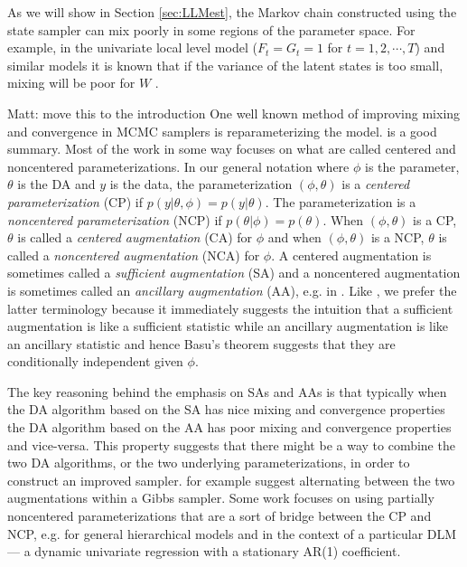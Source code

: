 \documentclass{article}
\newcommand{\matt}[1]{{\color{red} Matt: #1}}
\begin{document}
As we will show in Section \ref{sec:LLMest}, the Markov chain constructed using the state sampler can mix poorly in some regions of the parameter space. For example, in the univariate local level model ($F_t=G_t=1$ for $t=1,2,\cdots,T$) and similar models it is known that if the variance of the latent states is too small, mixing will be poor for $W$ \citep{fruhwirth2004efficient}.

\matt{move this to the introduction}
One well known method of improving mixing and convergence in MCMC samplers is reparameterizing the model. \citet{papaspiliopoulos2007general} is a good summary. Most of the work in some way focuses on what are called centered and noncentered parameterizations. In our general notation where $\phi$ is the parameter, $\theta$ is the DA and $y$ is the data, the parameterization $(\phi,\theta)$ is a {\it centered parameterization} (CP) if $p(y|\theta,\phi)=p(y|\theta)$. The parameterization is a {\it noncentered parameterization} (NCP) if $p(\theta|\phi)=p(\theta)$. When $(\phi,\theta)$ is a CP, $\theta$ is called a {\it centered augmentation} (CA) for $\phi$ and when $(\phi,\theta)$ is a NCP, $\theta$ is called a {\it noncentered augmentation} (NCA) for $\phi$. A centered augmentation is sometimes called a {\it sufficient augmentation} (SA) and a noncentered augmentation is sometimes called an {\it ancillary augmentation} (AA), e.g. in \citet{yu2011center}. Like \citet{yu2011center}, we prefer the latter terminology because it immediately suggests the intuition that a sufficient augmentation is like a sufficient statistic while an ancillary augmentation is like an ancillary statistic and hence Basu's theorem suggests that they are conditionally independent given $\phi$. 

The key reasoning behind the emphasis on SAs and AAs is that typically when the DA algorithm based on the SA has nice mixing and convergence properties the DA algorithm based on the AA has poor mixing and convergence properties and vice-versa. %
This property suggests that there might be a way to combine the two DA algorithms, or the two underlying parameterizations, in order to construct an improved sampler. \citet{papaspiliopoulos2007general} for example suggest alternating between the two augmentations within a Gibbs sampler. Some work focuses on using partially noncentered parameterizations that are a sort of bridge between the CP and NCP, e.g. \citet{papaspiliopoulos2007general} for general hierarchical models and \citet{fruhwirth2004efficient} in the context of a particular DLM --- a dynamic univariate regression with a stationary AR(1) coefficient. 
\end{document}
